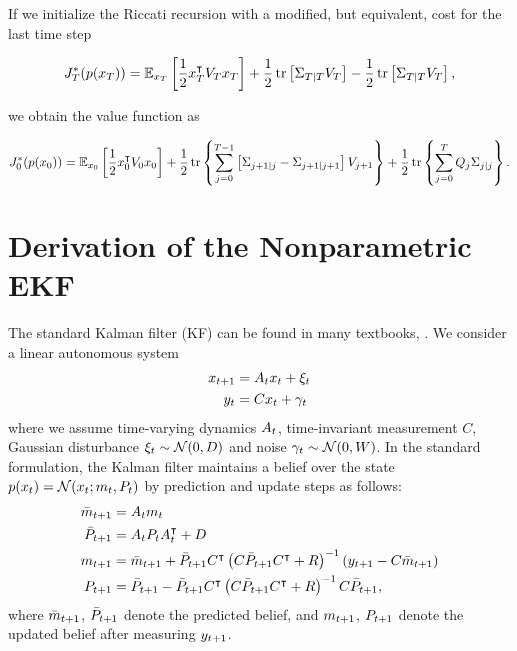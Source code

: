 If we initialize the Riccati recursion with a modified, but equivalent, cost for
the last time step
\begin{fullwidth}\vspace{-\baselineskip}
\begin{equation}
  J_T^*(p(x_T)) =  \mathbb{E}_{x_T} \left[\frac{1}{2} x_T^{\intercal} V_T x_T \right]
  + \frac{1}{2}\operatorname*{tr}\left[ \Sigma_{T|T} V_T \right]
  - \frac{1}{2}\operatorname*{tr}\left[ \Sigma_{T|T} V_T \right],
\end{equation}
\end{fullwidth}
we obtain the value function as
\begin{fullwidth}\vspace{-\baselineskip}
\begin{equation}
  J^*_0(p(x_0)) = \mathbb{E}_{x_0} \left[
  \frac{1}{2} x_0^{\intercal} V_0 x_0 \right]
  + \frac{1}{2}\operatorname*{tr}\left\{ \sum_{j=0}^{T-1} \left[\Sigma_{j+1|j} -
  \Sigma_{j+1|j+1}
  \right] V_{j+1} \right\} + \frac{1}{2}\operatorname*{tr}\left\{
  \sum_{j=0}^{T} Q_j\Sigma_{j|j} \right\}.
\end{equation}
\end{fullwidth}

\section{Derivation of the Nonparametric EKF}
\label{sec:appendix-a}

The standard Kalman filter (KF) \cite{Kalman:1960:New} can be found in many
textbooks, \eg \cite[]{Sarkka:2013:Bayesian}. We consider a linear
autonomous system
\begin{align}
  x_{t+1} &= A_t x_t + \xi_t \\
  y_{t} &= C x_t + \gamma_t
\end{align}
where we assume time-varying dynamics $A_t$, time-invariant
measurement $C$, Gaussian disturbance $\xi_t\sim\mathcal{N}(0,D)$ and noise
$\gamma_t\sim\mathcal{N}(0,W)$. In the standard formulation, the Kalman filter
maintains a belief over the state $p(x_t) = \mathcal{N}(x_t;m_t,P_t)$ by
prediction and update steps as follows:
\begin{align}
  \bar m_{t+1} &= A_t m_t \\
  \bar P_{t+1} &= A_t P_t A_t^{\intercal} + D \\
  m_{t+1} &= \bar m_{t+1} + \bar P_{t+1} C^{\intercal}
  \left(C\bar P_{t+1}C^{\intercal} + R\right)^{-1} (y_{t+1} - C \bar m_{t+1})\\
  P_{t+1} &= \bar P_{t+1} - \bar P_{t+1} C^{\intercal}
  \left(C\bar P_{t+1}C^{\intercal} + R\right)^{-1} C \bar P_{t+1},
\end{align}
where $\bar m_{t+1}$, $\bar P_{t+1}$ denote the predicted belief, and
$m_{t+1}$, $P_{t+1}$ denote the updated belief after measuring $y_{t+1}$.

